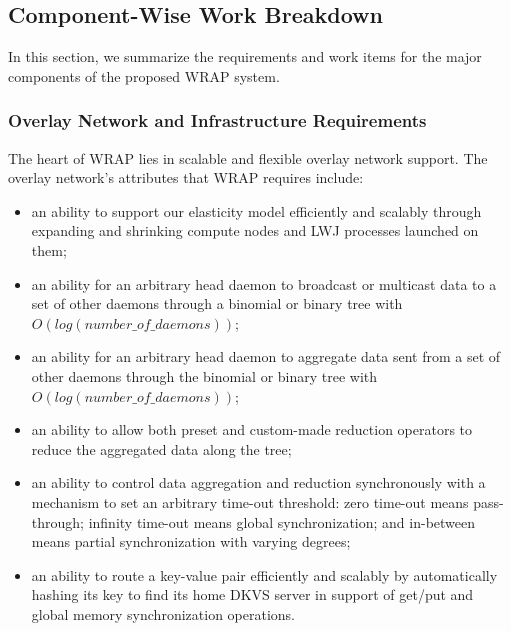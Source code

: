 \subsection{Component-Wise Work Breakdown}
In this section, we summarize the requirements and work items for
the major components of the proposed WRAP system.

\subsubsection{Overlay Network and Infrastructure Requirements}
The heart of WRAP lies in scalable and flexible overlay network support.
The overlay network's attributes that WRAP requires include:

\begin{itemize}

\item{an ability to support our elasticity model
efficiently and scalably through expanding and shrinking
compute nodes and LWJ processes launched on them;}

\item{an ability for an arbitrary head daemon to broadcast
or multicast data to a set of other daemons through a binomial
or binary tree with $O(log(number\_of\_daemons))$;}

\item{an ability for an arbitrary head daemon to aggregate data
sent from a set of other daemons through the binomial
or binary tree with $O(log(number\_of\_daemons))$;}

\item{an ability to allow both preset and custom-made reduction
operators to reduce the aggregated data along the tree;}

\item{an ability to control data aggregation and reduction synchronously
with a mechanism to set an arbitrary time-out threshold: zero time-out means pass-through;
infinity time-out means global synchronization; and
in-between means partial synchronization with varying degrees;}

\item{an ability to route a key-value pair efficiently and
scalably by automatically hashing its key to find its home DKVS server
in support of get/put and global memory synchronization operations.}

\end{itemize}

